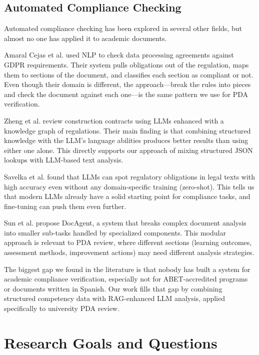 \documentclass[conference]{IEEEtran}
\begin{document}
\subsection{Automated Compliance Checking}

Automated compliance checking has been explored in several other fields, but almost no one has applied it to academic documents.

Amaral Cejas et al. \cite{amaral2023gdpr} used NLP to check data processing agreements against GDPR requirements. Their system pulls obligations out of the regulation, maps them to sections of the document, and classifies each section as compliant or not. Even though their domain is different, the approach---break the rules into pieces and check the document against each one---is the same pattern we use for PDA verification.

Zheng et al. \cite{zheng2025construction} review construction contracts using LLMs enhanced with a knowledge graph of regulations. Their main finding is that combining structured knowledge with the LLM's language abilities produces better results than using either one alone. This directly supports our approach of mixing structured JSON lookups with LLM-based text analysis.

Savelka et al. \cite{savelka2023legal} found that LLMs can spot regulatory obligations in legal texts with high accuracy even without any domain-specific training (zero-shot). This tells us that modern LLMs already have a solid starting point for compliance tasks, and fine-tuning can push them even further.

Sun et al. \cite{sun2025docagent} propose DocAgent, a system that breaks complex document analysis into smaller sub-tasks handled by specialized components. This modular approach is relevant to PDA review, where different sections (learning outcomes, assessment methods, improvement actions) may need different analysis strategies.

The biggest gap we found in the literature is that nobody has built a system for academic compliance verification, especially not for ABET-accredited programs or documents written in Spanish. Our work fills that gap by combining structured competency data with RAG-enhanced LLM analysis, applied specifically to university PDA review.

\section{Research Goals and Questions}
\end{document}
